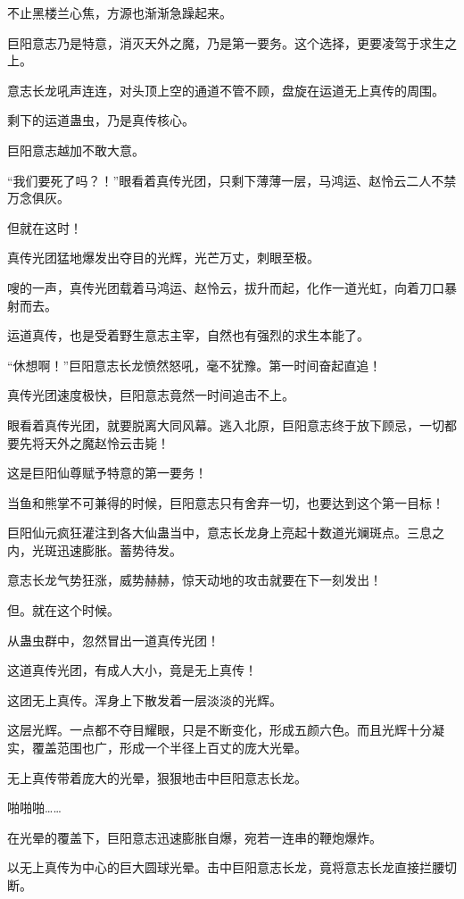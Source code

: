 \begin{this_body}
不止黑楼兰心焦，方源也渐渐急躁起来。

巨阳意志乃是特意，消灭天外之魔，乃是第一要务。这个选择，更要凌驾于求生之上。

意志长龙吼声连连，对头顶上空的通道不管不顾，盘旋在运道无上真传的周围。

剩下的运道蛊虫，乃是真传核心。

巨阳意志越加不敢大意。

“我们要死了吗？！”眼看着真传光团，只剩下薄薄一层，马鸿运、赵怜云二人不禁万念俱灰。

但就在这时！

真传光团猛地爆发出夺目的光辉，光芒万丈，刺眼至极。

嗖的一声，真传光团载着马鸿运、赵怜云，拔升而起，化作一道光虹，向着刀口暴射而去。

运道真传，也是受着野生意志主宰，自然也有强烈的求生本能了。

“休想啊！”巨阳意志长龙愤然怒吼，毫不犹豫。第一时间奋起直追！

真传光团速度极快，巨阳意志竟然一时间追击不上。

眼看着真传光团，就要脱离大同风幕。逃入北原，巨阳意志终于放下顾忌，一切都要先将天外之魔赵怜云击毙！

这是巨阳仙尊赋予特意的第一要务！

当鱼和熊掌不可兼得的时候，巨阳意志只有舍弃一切，也要达到这个第一目标！

巨阳仙元疯狂灌注到各大仙蛊当中，意志长龙身上亮起十数道光斓斑点。三息之内，光斑迅速膨胀。蓄势待发。

意志长龙气势狂涨，威势赫赫，惊天动地的攻击就要在下一刻发出！

但。就在这个时候。

从蛊虫群中，忽然冒出一道真传光团！

这道真传光团，有成人大小，竟是无上真传！

这团无上真传。浑身上下散发着一层淡淡的光辉。

这层光辉。一点都不夺目耀眼，只是不断变化，形成五颜六色。而且光辉十分凝实，覆盖范围也广，形成一个半径上百丈的庞大光晕。

无上真传带着庞大的光晕，狠狠地击中巨阳意志长龙。

啪啪啪……

在光晕的覆盖下，巨阳意志迅速膨胀自爆，宛若一连串的鞭炮爆炸。

以无上真传为中心的巨大圆球光晕。击中巨阳意志长龙，竟将意志长龙直接拦腰切断。


\end{this_body}
